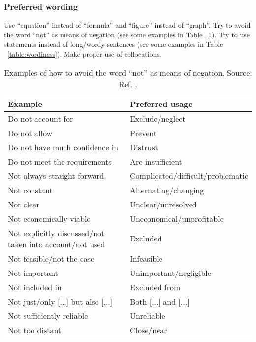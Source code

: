 \documentclass{article}
\begin{document}
\subsubsection{Preferred wording}
Use “equation” instead of “formula” and “figure” instead of “graph”. Try to avoid the word “not” as means of negation (see some examples in Table ~\ref{table:negation}). Try to use statements instead of long/wordy sentences (see some examples in Table ~\ref{table:wordiness}). Make proper use of collocations.
\begin{table}[H]
\centering
\caption{Examples of how to avoid the word “not” as means of negation. Source: Ref. \cite{Weiss}. }
\begin{tabular}{l l}
\hline \textbf{Example} & \textbf{Preferred usage} \\\hline
 Do not account for                 & Exclude/neglect   \\  
 Do not allow                       & Prevent           \\
 Do not have much confidence in     & Distrust          \\  
 Do not meet the requirements       & Are insufficient  \\
 Not always straight forward        & Complicated/difficult/problematic \\ 
 Not constant                       & Alternating/changing \\
 Not clear                          & Unclear/unresolved \\  
 Not economically viable            & Uneconomical/unprofitable \\
 Not explicitly discussed/not taken into account/not used & Excluded  \\  
 Not feasible/not the case          & Infeasible  \\
 Not important                      & Unimportant/negligible \\  
 Not included in                    & Excluded from \\
 Not just/only [...] but also [...] & Both [...] and [...] \\
 Not sufficiently reliable          & Unreliable \\
 Not too distant                    & Close/near \\ \hline
\end{tabular}
\label{table:negation}
\end{table}
\end{document}
